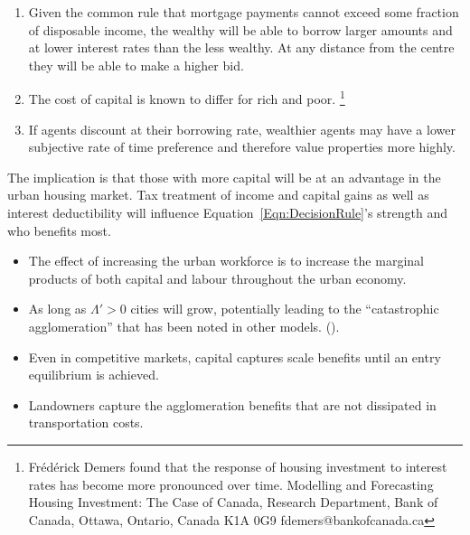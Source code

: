 \begin{enumerate}
\item Given the  common rule that mortgage payments cannot exceed some fraction of disposable income, the wealthy will be able to borrow larger amounts and at lower interest rates than the less wealthy. At any distance from the centre they will be able to make a higher bid.

\item The cost of capital is known to differ for rich and poor. \footnote{Fr\'ed\'erick Demers \cite{FredrickDemers} found that the response of housing investment to interest rates has become more pronounced over time. Modelling and Forecasting Housing Investment: The Case of Canada,  Research Department, Bank of Canada, Ottawa, Ontario, Canada K1A 0G9 fdemers@bankofcanada.ca} 


\item If agents discount at their borrowing rate, wealthier agents may have a lower subjective rate of time preference and therefore value properties more highly. 
\end{enumerate}
The implication is that those with more capital will be at an advantage in the urban housing  market. Tax treatment of income and capital gains as well as interest deductibility will influence Equation~\ref{Eqn:DecisionRule}'s strength and who benefits most. 

\begin{itemize}
\item The effect of increasing the urban workforce is to increase the marginal products of  both capital and labour throughout the urban economy.%
 \item  As long as $\Lambda'>0$ cities will  grow, potentially leading to the ``catastrophic agglomeration''  that has been noted in other models.  (\cite{fujitaSpatialEconomyCities1999, baldwinAgglomerationRegionalGrowth2004, krugmanIncreasingReturnsEconomic1991, gurwitzCatastrophicAgglomeration2019}).%
\item Even in competitive markets, capital captures scale benefits until an entry equilibrium is achieved.
\item Landowners  capture the agglomeration benefits that are not dissipated in transportation costs.
\end{itemize}

